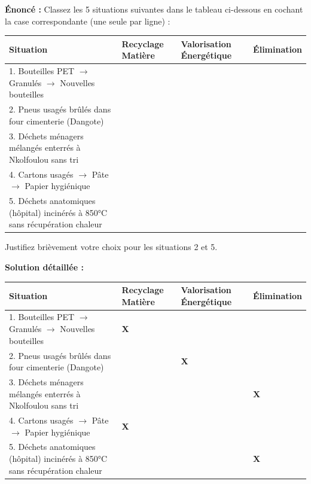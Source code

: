 \documentclass[11pt]{article}
\begin{document}
\begin{exoresolu}
\textbf{Énoncé :} Classez les 5 situations suivantes dans le tableau ci-dessous en cochant la case correspondante (une seule par ligne) :

\begin{center}
\begin{tabularx}{\linewidth}{|l|>{\centering\arraybackslash}X|>{\centering\arraybackslash}X|>{\centering\arraybackslash}X|}\hline
\textbf{Situation} & \textbf{Recyclage Matière} & \textbf{Valorisation Énergétique} & \textbf{Élimination} \\ \hline
1. Bouteilles PET $\rightarrow$ Granulés $\rightarrow$ Nouvelles bouteilles & & & \\ \hline
2. Pneus usagés brûlés dans four cimenterie (Dangote) & & & \\ \hline
3. Déchets ménagers mélangés enterrés à Nkolfoulou sans tri & & & \\ \hline
4. Cartons usagés $\rightarrow$ Pâte $\rightarrow$ Papier hygiénique & & & \\ \hline
5. Déchets anatomiques (hôpital) incinérés à 850°C sans récupération chaleur & & & \\ \hline
\end{tabularx}
\end{center}
Justifiez brièvement votre choix pour les situations 2 et 5.

\tcblower

\textbf{Solution détaillée :}

\begin{center}
\begin{tabularx}{\linewidth}{|l|>{\centering\arraybackslash}X|>{\centering\arraybackslash}X|>{\centering\arraybackslash}X|}\hline
\textbf{Situation} & \textbf{Recyclage Matière} & \textbf{Valorisation Énergétique} & \textbf{Élimination} \\ \hline
1. Bouteilles PET $\rightarrow$ Granulés $\rightarrow$ Nouvelles bouteilles & \textbf{X} & & \\ \hline
2. Pneus usagés brûlés dans four cimenterie (Dangote) & & \textbf{X} & \\ \hline
3. Déchets ménagers mélangés enterrés à Nkolfoulou sans tri & & & \textbf{X} \\ \hline
4. Cartons usagés $\rightarrow$ Pâte $\rightarrow$ Papier hygiénique & \textbf{X} & & \\ \hline
5. Déchets anatomiques (hôpital) incinérés à 850°C sans récupération chaleur & & & \textbf{X} \\ \hline
\end{tabularx}
\end{center}


\end{exoresolu}
\end{document}
